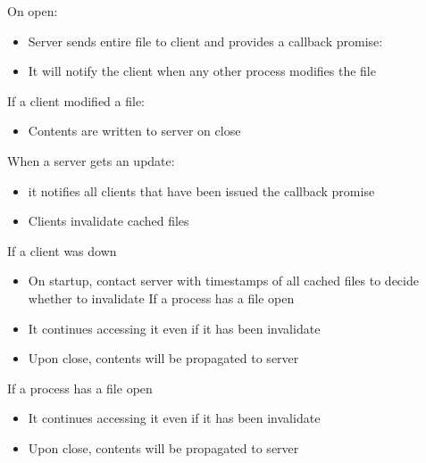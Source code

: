 \begin{slide}

	
	On open: 
	\begin{itemize}
		\item Server sends entire file to client and provides a callback promise: 
		\item It will notify the client when any other process modifies the file 
	\end{itemize}
	\medskip
	
	If a client modified a file: 
	\begin{itemize}
		\item Contents are written to server on close 
	\end{itemize}
	\medskip
	
	When a server gets an update: 
	\begin{itemize}
		\item it notifies all clients that have been issued the callback promise 
		\item Clients invalidate cached files 
	\end{itemize}
	
\end{slide}

\begin{slide}

	
	If a client was down  
	\begin{itemize}
		\item On startup, contact server with timestamps of all cached files to decide whether to invalidate If a process has a file open
		\item It continues accessing it even if it has been invalidate
		\item Upon close, contents will be propagated to server 
	\end{itemize}
	\medskip
	
	If a process has a file open
	\begin{itemize}
		\item It continues accessing it even if it has been invalidate 
		\item Upon close, contents will be propagated to server 
	\end{itemize}
	
\end{slide}


